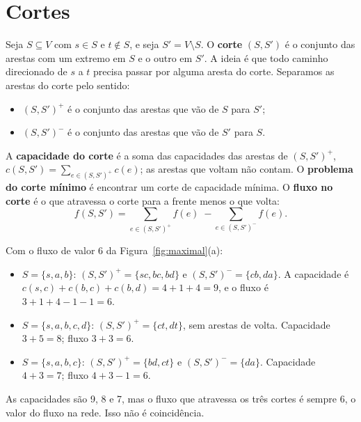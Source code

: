 \section{Cortes}\label{sec:cortes}
Seja $S\subseteq V$ com $s\in S$ e $t\notin S$, e seja $S'=V\setminus S$. O \textbf{corte} $(S,S')$ é o conjunto das arestas com um extremo em $S$ e o outro em $S'$. A ideia é que todo caminho direcionado de $s$ a $t$ precisa passar por alguma aresta do corte. Separamos as arestas do corte pelo sentido:
\begin{itemize}
  \item $(S,S')^+$ é o conjunto das arestas que vão de $S$ para $S'$;
  \item $(S,S')^-$ é o conjunto das arestas que vão de $S'$ para $S$.
\end{itemize}
A \textbf{capacidade do corte} é a soma das capacidades das arestas de $(S,S')^+$, $c(S,S')=\sum_{e\in(S,S')^+}c(e)$; as arestas que voltam não contam. O \textbf{problema do corte mínimo} é encontrar um corte de capacidade mínima. O \textbf{fluxo no corte} é o que atravessa o corte para a frente menos o que volta:
\[
f(S,S')=\sum_{e\in(S,S')^+}f(e)\;-\sum_{e\in(S,S')^-}f(e).
\]

\begin{exemplo}\label{ex:cortes}
Com o fluxo de valor 6 da Figura~\ref{fig:maximal}(a):
\begin{itemize}
  \item $S=\{s,a,b\}$: $(S,S')^+=\{sc,bc,bd\}$ e $(S,S')^-=\{cb,da\}$. A capacidade é $c(s,c)+c(b,c)+c(b,d)=4+1+4=9$, e o fluxo é $3+1+4-1-1=6$.
  \item $S=\{s,a,b,c,d\}$: $(S,S')^+=\{ct,dt\}$, sem arestas de volta. Capacidade $3+5=8$; fluxo $3+3=6$.
  \item $S=\{s,a,b,c\}$: $(S,S')^+=\{bd,ct\}$ e $(S,S')^-=\{da\}$. Capacidade $4+3=7$; fluxo $4+3-1=6$.
\end{itemize}
As capacidades são 9, 8 e 7, mas o fluxo que atravessa os três cortes é sempre 6, o valor do fluxo na rede. Isso não é coincidência.
\begin{figura}[O corte $(S,S')$ com $S=\{s,a,b,c\}$ (vértices em azul) e o fluxo máximo de valor 7. As arestas de $(S,S')^+$, $bd$ e $ct$, estão saturadas, e a aresta de volta, $da$, tem fluxo zero: a capacidade do corte, 7, é igual ao valor do fluxo.\label{fig:cortemin}]
\end{figura}
\end{exemplo}

